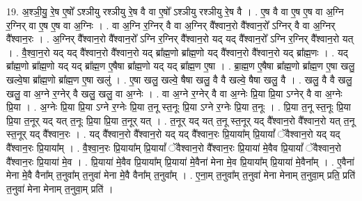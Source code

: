 \documentclass[17pt]{extarticle}
\begin{document}
19. अ॒श्ञी॒यु॒ रे॒ष ए॒षो᳚ ऽश्ञीयु रश्ञीयु रे॒ष वै वा ए॒षो᳚ ऽश्ञीयु रश्ञीयु रे॒ष वै । . ए॒ष वै वा ए॒ष ए॒ष वा अ॒ग्नि र॒ग्निर् वा ए॒ष ए॒ष वा अ॒ग्निः । . वा अ॒ग्नि र॒ग्निर् वै वा अ॒ग्निर् वै᳚श्वान॒रो वै᳚श्वान॒रो᳚ ऽग्निर् वै वा अ॒ग्निर् वै᳚श्वान॒रः । . अ॒ग्निर् वै᳚श्वान॒रो वै᳚श्वान॒रो᳚ ऽग्नि र॒ग्निर् वै᳚श्वान॒रो यद् यद् वै᳚श्वान॒रो᳚ ऽग्नि र॒ग्निर् वै᳚श्वान॒रो यत् । . वै॒श्वा॒न॒रो यद् यद् वै᳚श्वान॒रो वै᳚श्वान॒रो यद् ब्रा᳚ह्म॒णो ब्रा᳚ह्म॒णो यद् वै᳚श्वान॒रो वै᳚श्वान॒रो यद् ब्रा᳚ह्म॒णः । . यद् ब्रा᳚ह्म॒णो ब्रा᳚ह्म॒णो यद् यद् ब्रा᳚ह्म॒ण ए॒षैषा ब्रा᳚ह्म॒णो यद् यद् ब्रा᳚ह्म॒ण ए॒षा । . ब्रा॒ह्म॒ण ए॒षैषा ब्रा᳚ह्म॒णो ब्रा᳚ह्म॒ण ए॒षा खलु॒ खल्वे॒षा ब्रा᳚ह्म॒णो ब्रा᳚ह्म॒ण ए॒षा खलु॑ । . ए॒षा खलु॒ खल्वे॒ षैषा खलु॒ वै वै खल्वे॒ षैषा खलु॒ वै । . खलु॒ वै वै खलु॒ खलु॒ वा अ॒ग्ने र॒ग्नेर् वै खलु॒ खलु॒ वा अ॒ग्नेः । . वा अ॒ग्ने र॒ग्नेर् वै वा अ॒ग्नेः प्रि॒या प्रि॒या ऽग्नेर् वै वा अ॒ग्नेः प्रि॒या । . अ॒ग्नेः प्रि॒या प्रि॒या ऽग्ने र॒ग्नेः प्रि॒या त॒नू स्त॒नूः प्रि॒या ऽग्ने र॒ग्नेः प्रि॒या त॒नूः । . प्रि॒या त॒नू स्त॒नूः प्रि॒या प्रि॒या त॒नूर् यद् यत् त॒नूः प्रि॒या प्रि॒या त॒नूर् यत् । . त॒नूर् यद् यत् त॒नू स्त॒नूर् यद् वै᳚श्वान॒रो वै᳚श्वान॒रो यत् त॒नू स्त॒नूर् यद् वै᳚श्वान॒रः । . यद् वै᳚श्वान॒रो वै᳚श्वान॒रो यद् यद् वै᳚श्वान॒रः प्रि॒याया᳚म् प्रि॒यायां᳚ ॅवैश्वान॒रो यद् यद् वै᳚श्वान॒रः प्रि॒याया᳚म् । . वै॒श्वा॒न॒रः प्रि॒याया᳚म् प्रि॒यायां᳚ ॅवैश्वान॒रो वै᳚श्वान॒रः प्रि॒याया॑ मे॒वैव प्रि॒यायां᳚ ॅवैश्वान॒रो वै᳚श्वान॒रः प्रि॒याया॑ मे॒व । . प्रि॒याया॑ मे॒वैव प्रि॒याया᳚म् प्रि॒याया॑ मे॒वैना॑ मेना मे॒व प्रि॒याया᳚म् प्रि॒याया॑ मे॒वैना᳚म् । . ए॒वैना॑ मेना मे॒वै वैना᳚म् त॒नुवा᳚म् त॒नुवा॑ मेना मे॒वै वैना᳚म् त॒नुवा᳚म् । . ए॒ना॒म् त॒नुवा᳚म् त॒नुवा॑ मेना मेनाम् त॒नुवा॒म् प्रति॒ प्रति॑ त॒नुवा॑ मेना मेनाम् त॒नुवा॒म् प्रति॑ । \newline
\end{document}
